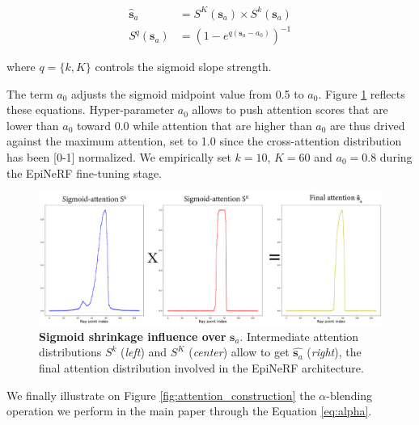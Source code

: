 \begin{align}
\hat{\textbf{s}}_{a} &= S^{K}(\textbf{s}_{a})\times S^{k}(\textbf{s}_{a}) \\
S^{q}(\mathbf{s}_{a}) &= \left(1- e^{q(\mathbf{s}_{a}-a_{0})}\right)^{-1}
\end{align}

where $q=\{k,K\}$ controls the sigmoid slope strength. \newline

The term $a_{0}$ adjusts the sigmoid midpoint value from 0.5 to $a_{0}$. Figure \ref{fig:attention_sigmoid} reflects these equations. Hyper-parameter $a_{0}$ allows to push attention scores that are lower than  $a_{0}$ toward 0.0 while attention that are higher than $a_{0}$ are thus drived against the maximum attention, set to 1.0 since the cross-attention distribution has been [0-1] normalized. We empirically set $k=10$, $K=60$ and $a_{0}=0.8$ during the EpiNeRF fine-tuning stage.\newline

\begin{figure}[h!]
    \begin{center}
  \includegraphics[width=\linewidth]{images/epinerf/SUPP_ATT_OVERLEAF.png}
  \caption{\textbf{Sigmoid shrinkage influence over} $\textbf{s}_{a}$. Intermediate attention distributions $S^{k}$ (\textit{left}) and $S^{K}$ (\textit{center}) allow to get $\hat{\mathbf{s}_{a}}$ (\textit{right}), the final attention distribution involved in the EpiNeRF architecture.}
  \label{fig:attention_sigmoid}
  \end{center}
\end{figure}

We finally illustrate on Figure \ref{fig:attention_construction} the $\alpha$-blending operation we perform in the main paper through the Equation \ref{eq:alpha}. 


